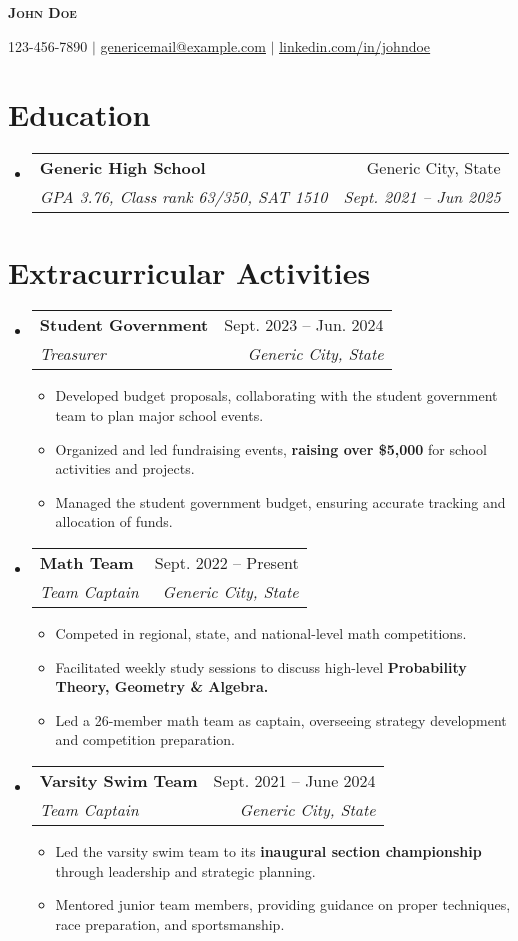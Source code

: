 \documentclass[letterpaper,11pt]{article}
\makeatletter
\newcommand{\resumeItem}[1]{
\item\small{
    {#1 \vspace{-2pt}}
  }
}
\newcommand{\resumeSubheading}[4]{
  \vspace{-2pt}
\item
  \begin{tabular*}{0.97\textwidth}[t]{l@{\extracolsep{\fill}}r}
    \textbf{#1} & #2 \\
    \textit{\small#3} & \textit{\small #4} \\
  \end{tabular*}\vspace{-7pt}
}
\newcommand{\resumeSubHeadingListStart}{
\begin{itemize}[leftmargin=0.15in, label={}]}
\newcommand{\resumeSubHeadingListEnd}{
  \end{itemize}}
\newcommand{\resumeItemListStart}{
\begin{itemize}}
\newcommand{\resumeItemListEnd}{
  \end{itemize}\vspace{-5pt}}
\makeatother
\begin{document}
\begin{center}
  \textbf{\Huge \scshape John Doe}

  \small 123-456-7890 $|$
  \href{mailto:genericemail@example.com}{\underline{genericemail@example.com}} $|$
  \href{https://linkedin.com/in/johndoe}{\underline{linkedin.com/in/johndoe}}
\end{center}

\section{Education}
\resumeSubHeadingListStart
\resumeSubheading
{Generic High School}{Generic City, State}
{GPA 3.76, Class rank 63/350, SAT 1510}{Sept. 2021 -- Jun 2025}
\resumeSubHeadingListEnd

\section{Extracurricular Activities}
\resumeSubHeadingListStart

\resumeSubheading
{Student Government}{Sept. 2023 -- Jun. 2024}
{Treasurer}{Generic City, State}
\resumeItemListStart
\resumeItem{Developed budget proposals, collaborating with the student government team to plan major school events.}
\resumeItem{Organized and led fundraising events, \textbf{raising over \$5,000} for school activities and projects.}
\resumeItem{Managed the student government budget, ensuring accurate tracking and allocation of funds.}
\resumeItemListEnd

\resumeSubheading
{Math Team}{Sept. 2022 -- Present}
{Team Captain}{Generic City, State}
\resumeItemListStart
\resumeItem{Competed in regional, state, and national-level math competitions.}
\resumeItem{Facilitated weekly study sessions to discuss high-level \textbf{Probability Theory, Geometry \& Algebra.}}
\resumeItem{Led a 26-member math team as captain, overseeing strategy development and competition preparation.}
\resumeItemListEnd

\resumeSubheading
{Varsity Swim Team}{Sept. 2021 -- June 2024}
{Team Captain}{Generic City, State}
\resumeItemListStart
\resumeItem{Led the varsity swim team to its \textbf{inaugural section championship} through leadership and strategic planning.}
\resumeItem{Mentored junior team members, providing guidance on proper techniques, race preparation, and sportsmanship.}
\resumeItemListEnd

\resumeSubHeadingListEnd
\end{document}
